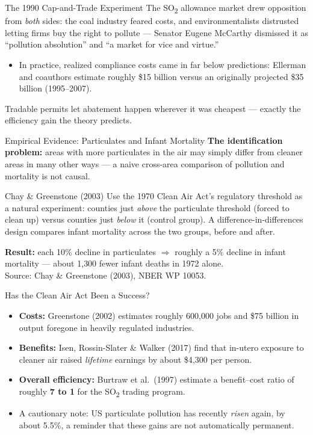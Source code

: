 \documentclass[11pt,aspectratio=169]{beamer}
\newcommand{\srcnote}[1]{{\footnotesize\color{wugray}Source: #1}}
\begin{document}
\begin{frame}{The 1990 Cap-and-Trade Experiment}
  The SO\textsubscript{2} allowance market drew opposition from \emph{both} sides: the coal industry feared costs, and environmentalists distrusted letting firms buy the right to pollute --- Senator Eugene McCarthy dismissed it as ``pollution absolution'' and ``a market for vice and virtue.''
  \begin{itemize}
    \item In practice, realized compliance costs came in far below predictions: Ellerman and coauthors estimate roughly \$15 billion versus an originally projected \$35 billion (1995--2007).
  \end{itemize}
  \small Tradable permits let abatement happen wherever it was cheapest --- exactly the efficiency gain the theory predicts.
\end{frame}

\begin{frame}{Empirical Evidence: Particulates and Infant Mortality}
  \textbf{The identification problem:} areas with more particulates in the air may simply differ from cleaner areas in many other ways --- a naive cross-area comparison of pollution and mortality is not causal.
  \begin{block}{Chay \& Greenstone (2003)}
    Use the 1970 Clean Air Act's regulatory threshold as a natural experiment: counties just \emph{above} the particulate threshold (forced to clean up) versus counties just \emph{below} it (control group). A difference-in-differences design compares infant mortality across the two groups, before and after.
  \end{block}
  \textbf{Result:} each 10\% decline in particulates $\Rightarrow$ roughly a 5\% decline in infant mortality --- about 1{,}300 fewer infant deaths in 1972 alone.\\
  \srcnote{Chay \& Greenstone (2003), NBER WP 10053.}
\end{frame}

\begin{frame}{Has the Clean Air Act Been a Success?}
  \begin{itemize}
    \item \textbf{Costs:} Greenstone (2002) estimates roughly 600{,}000 jobs and \$75 billion in output foregone in heavily regulated industries.
    \item \textbf{Benefits:} Isen, Rossin-Slater \& Walker (2017) find that in-utero exposure to cleaner air raised \emph{lifetime} earnings by about \$4{,}300 per person.
    \item \textbf{Overall efficiency:} Burtraw et al.\ (1997) estimate a benefit--cost ratio of roughly \textbf{7 to 1} for the SO\textsubscript{2} trading program.
    \item A cautionary note: US particulate pollution has recently \emph{risen} again, by about 5.5\%, a reminder that these gains are not automatically permanent.
  \end{itemize}
\end{frame}
\end{document}

